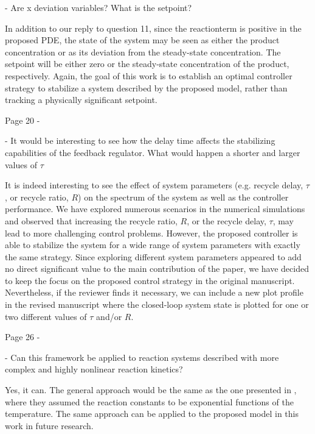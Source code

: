 \documentclass[12pt,answers]{exam}
\begin{document}
\begin{questions}
    - Are x deviation variables? What is the setpoint?

    \begin{solutionorbox}
        In addition to our reply to question 11, since the reactionterm is positive in the proposed PDE, the state of the system may be seen as either the product concentration or as its deviation from the steady-state concentration. The setpoint will be either zero or the steady-state concentration of the product, respectively. Again, the goal of this work is to establish an optimal controller strategy to stabilize a system described by the proposed model, rather than tracking a physically significant setpoint.
    \end{solutionorbox}


    \question Page 20 - 

    - It would be interesting to see how the delay time affects the stabilizing capabilities of the feedback regulator. What would happen a shorter and larger values of $\tau$

    \begin{solutionorbox}
        It is indeed interesting to see the effect of system parameters (e.g. recycle delay, $\tau$, or recycle ratio, $R$) on the spectrum of the system as well as the controller performance. We have explored numerous scenarios in the numerical simulations and observed that increasing the recycle ratio, $R$, or the recycle delay, $\tau$, may lead to more challenging control problems. However, the proposed controller is able to stabilize the system for a wide range of system parameters with exactly the same strategy. Since exploring different system parameters appeared to add no direct significant value to the main contribution of the paper, we have decided to keep the focus on the proposed control strategy in the original manuscript. Nevertheless, if the reviewer finds it necessary, we can include a new plot profile in the revised manuscript where the closed-loop system state is plotted for one or two different values of $\tau$ and/or $R$.
    \end{solutionorbox}


    \question Page 26 - 

    - Can this framework be applied to reaction systems described with more complex and highly nonlinear reaction kinetics?

    \begin{solutionorbox}
        Yes, it can. The general approach would be the same as the one presented in \cite{khatibi2021model}, where they assumed the reaction constants to be exponential functions of the temperature. The same approach can be applied to the proposed model in this work in future research.
    \end{solutionorbox}


\end{questions}
\end{document}
